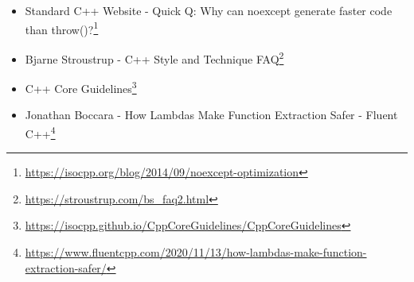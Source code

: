 \begin{itemize}
\item Standard C++ Website - Quick Q: Why can noexcept generate faster code than throw()?\footnote{\url{https://isocpp.org/blog/2014/09/noexcept-optimization}}
\item Bjarne Stroustrup - C++ Style and Technique FAQ\footnote{\url{https://stroustrup.com/bs_faq2.html}}
\item C++ Core Guidelines\footnote{\url{https://isocpp.github.io/CppCoreGuidelines/CppCoreGuidelines}}
\item Jonathan Boccara - How Lambdas Make Function Extraction Safer - Fluent C++\footnote{\url{https://www.fluentcpp.com/2020/11/13/how-lambdas-make-function-extraction-safer/}}
\end{itemize}


